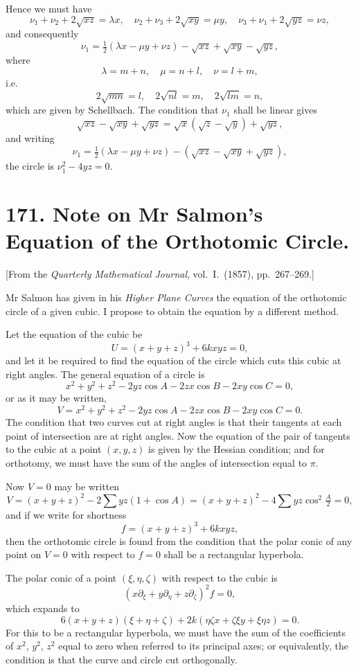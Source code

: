 \documentclass[11pt,a4paper]{book}
\begin{document}
Hence we must have
\[
\nu_1 + \nu_2 + 2\sqrt{xz} = \lambda x,\quad
\nu_2 + \nu_3 + 2\sqrt{xy} = \mu y,\quad
\nu_3 + \nu_1 + 2\sqrt{yz} = \nu z,
\]
and consequently
\[
\nu_1 = \tfrac{1}{2}(\lambda x - \mu y + \nu z) - \sqrt{xz} + \sqrt{xy} - \sqrt{yz},
\]
where
\[
\lambda = m+n,\quad \mu = n+l,\quad \nu = l+m,
\]
i.e.
\[
2\sqrt{mn} = l,\quad 2\sqrt{nl} = m,\quad 2\sqrt{lm} = n,
\]
which are given by Schellbach. The condition that $\nu_1$ shall be linear gives
\[
\sqrt{xz} - \sqrt{xy} + \sqrt{yz} = \sqrt{x}(\sqrt{z} - \sqrt{y}) + \sqrt{yz},
\]
and writing
\[
\nu_1 = \tfrac{1}{2}(\lambda x - \mu y + \nu z) - (\sqrt{xz} - \sqrt{xy} + \sqrt{yz}),
\]
the circle is $\nu_1^2 - 4yz = 0$.


\newpage
\section*{171. Note on Mr Salmon's Equation of the Orthotomic Circle.}

[From the \textit{Quarterly Mathematical Journal}, vol.~I.~(1857), pp.~267--269.]

Mr Salmon has given in his \textit{Higher Plane Curves} the equation of the orthotomic circle of a given cubic. I propose to obtain the equation by a different method.

Let the equation of the cubic be
\[
U = (x+y+z)^3 + 6kxyz = 0,
\]
and let it be required to find the equation of the circle which cuts this cubic at right angles. The general equation of a circle is
\[
x^2+y^2+z^2-2yz\cos A-2zx\cos B-2xy\cos C = 0,
\]
or as it may be written,
\[
V = x^2+y^2+z^2-2yz\cos A-2zx\cos B-2xy\cos C = 0.
\]
The condition that two curves cut at right angles is that their tangents at each point of intersection are at right angles. Now the equation of the pair of tangents to the cubic at a point $(x,y,z)$ is given by the Hessian condition; and for orthotomy, we must have the sum of the angles of intersection equal to $\pi$.

Now $V=0$ may be written
\[
V = (x+y+z)^2 - 2\sum yz(1+\cos A) = (x+y+z)^2 - 4\sum yz\cos^2\tfrac{A}{2} = 0,
\]
and if we write for shortness
\[
f = (x+y+z)^3 + 6kxyz,
\]
then the orthotomic circle is found from the condition that the polar conic of any point on $V=0$ with respect to $f=0$ shall be a rectangular hyperbola.

The polar conic of a point $(\xi,\eta,\zeta)$ with respect to the cubic is
\[
(x\partial_\xi + y\partial_\eta + z\partial_\zeta)^2 f = 0,
\]
which expands to
\[
6(x+y+z)(\xi+\eta+\zeta) + 2k(\eta\zeta x + \zeta\xi y + \xi\eta z) = 0.
\]
For this to be a rectangular hyperbola, we must have the sum of the coefficients of $x^2$, $y^2$, $z^2$ equal to zero when referred to its principal axes; or equivalently, the condition is that the curve and circle cut orthogonally.
\end{document}
